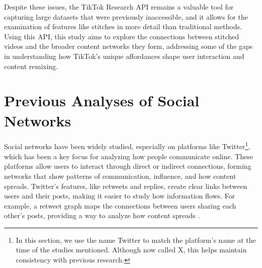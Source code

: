 Despite these issues, the TikTok Research API remains a valuable tool for capturing large datasets that were previously inaccessible, and it allows for the examination of features like stitches in more detail than traditional methods. Using this API, this study aims to explore the connections between stitched videos and the broader content networks they form, addressing some of the gaps in understanding how TikTok’s unique affordances shape user interaction and content remixing.



\section{Previous Analyses of Social Networks}
Social networks have been widely studied, especially on platforms like Twitter\footnote{In this section, we use the name Twitter to match the platform’s name at the time of the studies mentioned. Although now called X, this helps maintain consistency with previous research.}, which has been a key focus for analyzing how people communicate online. These platforms allow users to interact through direct or indirect connections, forming networks that show patterns of communication, influence, and how content spreads. Twitter’s features, like retweets and replies, create clear links between users and their posts, making it easier to study how information flows. For example, a retweet graph maps the connections between users sharing each other’s posts, providing a way to analyze how content spreads \citep{bild2015aggregate}.

